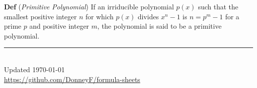\documentclass[12pt,landscape]{article}
\newcommand{\defn}[1]{\textbf{Def} (\emph{#1})}
\begin{document}
\begin{multicols}{3}
\defn{Primitive Polynomial} If an irriducible polynomial $p(x)$ such that the smallest positive integer $n$ for which $p(x)$ divides $x^n - 1$ is $n=p^m - 1$ for a prime $p$ and positive integer $m$, the polynomial is said to be a primitive polynomial.

\rule{0.3\linewidth}{0.25pt}
\scriptsize\\
Updated \today\\
\href{https://github.com/DonneyF/formula-sheets}{https://github.com/DonneyF/formula-sheets}
\end{multicols}
\end{document}
